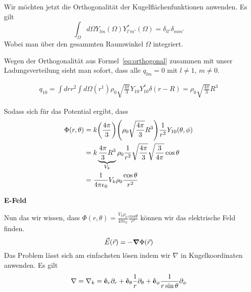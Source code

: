 \begin{enumerate}[label=\alph*)]
    Wir möchten jetzt die Orthogonalität der Kugelflächenfunktionen
    anwenden. Es gilt
    \begin{equation}\label{eq:orthogonal}
      \int_\Omega d\Omega Y_{lm}(\Omega) Y^*_{l'm'}(\Omega)
      =\delta_{ll'}\delta_{mm'}
    \end{equation}
    Wobei man über den gesammten Raumwinkel $\Omega$ integriert.
    
    Wegen der Orthogonalität aus Formel~\ref{eq:orthogonal} zusammen mit
    unser Ladungsverteilung sieht man sofort, dass alle $q_{lm}=0$ mit 
    $l\neq 1$, $m\neq0$.

    \begin{equation*}
      \begin{split}
        q_{10}=\int dr r^2 \int d\Omega (r^1) \rho_0 \sqrt{\frac{4\pi}{3}}
        Y_{10}Y^*_{10}\delta(r-R)=\rho_0 \sqrt{\frac{4\pi}{3}}R^3
      \end{split}
    \end{equation*}

    Sodass sich für das Potential ergibt, dass
    \begin{equation}
      \begin{split}
      \Phi(r,\theta) 
      &= 
      k
      \qty(\frac{4\pi}{3})
      \qty(\rho_0 \sqrt{\frac{4\pi}{3}}R^3)
      \frac{1}{r^2}
      Y_{10}(\theta,\phi)\\
      &= 
      k
      \underbrace{\frac{4\pi}{3}R^3}_{V_k}\rho_0
      \frac{1}{r^2}
      \sqrt{\frac{4\pi}{3}}\sqrt{\frac{3}{4\pi}}\cos\theta\\
      &=\frac{1}{4\pi\epsilon_0}V_k\rho_0 \frac{\cos\theta}{r^2} 
      \end{split}
    \end{equation}

    \textbf{E-Feld} 

    Nun das wir wissen, dass 
    $\Phi(r,\theta)
    =\frac{V_k\rho_0}{4\pi\epsilon_0}\frac{cos\theta}{r^2}$ können wir das
    elektrische Feld finden.
    \begin{equation}
      \vec E(\vec r)=-\grad\Phi(\vec r)
    \end{equation}
    Das Problem lässt sich am einfachsten lösen indem wir $\nabla$ in
    Kugelkoordinaten anwenden. Es gilt
    \begin{equation*}
    \nabla=\nabla_k
    =\vu e_r \partial_r 
    + \vu e_\theta \frac{1}{r}\partial_\theta
    + \vu e_\phi \frac{1}{r\sin\theta}\partial_\phi
    \end{equation*}


\end{enumerate}

